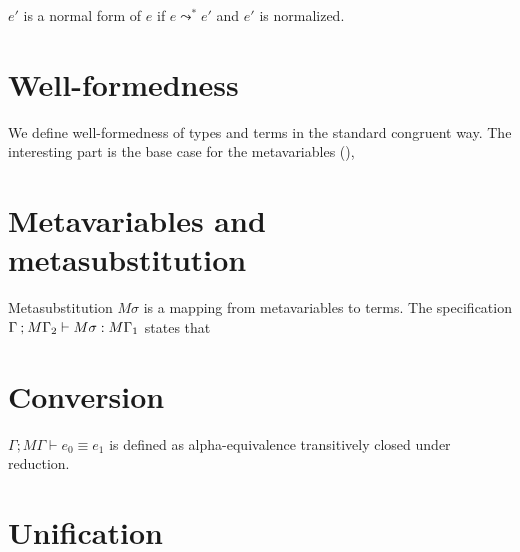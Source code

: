 \documentclass[acmsmall,natbib=false,review,anonymous]{acmart}
\begin{document}
\begin{definition}
  $e'$ is a normal form of $e$ if
  $e  \leadsto^*  e'$ and $e'$ is normalized.
\end{definition}


\section{Well-formedness}

We define well-formedness of types and terms
in the standard congruent way.
The interesting part is the base case for the metavariables
(),

  \begin{ottdefnblock}[]{\ottdefnHeaderWfWF}{}
    \ottusedrule{\ottdruleWfWFVarLabeled[]{}}
    \ottusedrule{\ottdruleWfWFPLamLabeled[]{}}
    \ottusedrule{\ottdruleWfWFAVarLabeled[]{}}
  \end{ottdefnblock}


\section{Metavariables and metasubstitution}

\begin{definition}
  Metasubstitution $M\sigma$
  is a mapping from metavariables to terms.
  The  specification 
  $\Gamma  \mathbin{;}  M\Gamma_{{\mathrm{2}}}  \vdash  M\sigma  :  M\Gamma_{{\mathrm{1}}}$ states that
\end{definition}


\section{Conversion}

\begin{definition}
 $\Gamma  \mathbin{;}  M\Gamma  \vdash  e_{{\mathrm{0}}}  \equiv  e_{{\mathrm{1}}}$
 is defined as alpha-equivalence 
 transitively closed under reduction. 
\end{definition}



\section{Unification}
\end{document}

